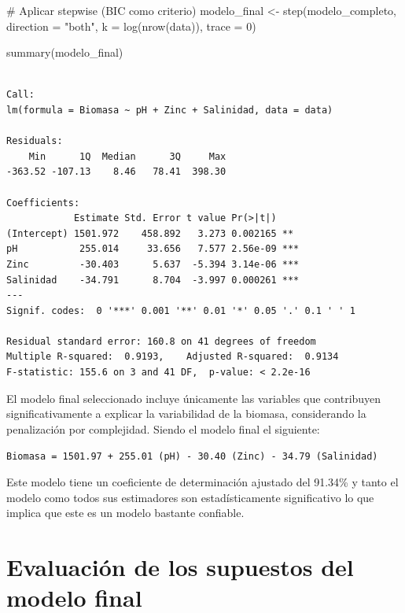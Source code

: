\documentclass[
  spanish,
  a4paper,
  DIV=11,
  numbers=noendperiod,
  onepage,
  openany]{scrreprt}
\newenvironment{Shaded}{\begin{snugshade}}{\end{snugshade}}
\newcommand{\AttributeTok}[1]{\textcolor[rgb]{0.40,0.45,0.13}{#1}}
\newcommand{\CommentTok}[1]{\textcolor[rgb]{0.37,0.37,0.37}{#1}}
\newcommand{\DecValTok}[1]{\textcolor[rgb]{0.68,0.00,0.00}{#1}}
\newcommand{\FunctionTok}[1]{\textcolor[rgb]{0.28,0.35,0.67}{#1}}
\newcommand{\NormalTok}[1]{\textcolor[rgb]{0.00,0.23,0.31}{#1}}
\newcommand{\OtherTok}[1]{\textcolor[rgb]{0.00,0.23,0.31}{#1}}
\newcommand{\StringTok}[1]{\textcolor[rgb]{0.13,0.47,0.30}{#1}}
\begin{document}
\begin{Shaded}
\begin{Highlighting}[]
\CommentTok{\# Aplicar stepwise (BIC como criterio)}
\NormalTok{modelo\_final }\OtherTok{\textless{}{-}} \FunctionTok{step}\NormalTok{(modelo\_completo, }\AttributeTok{direction =} \StringTok{"both"}\NormalTok{,}
                     \AttributeTok{k =} \FunctionTok{log}\NormalTok{(}\FunctionTok{nrow}\NormalTok{(data)), }\AttributeTok{trace =} \DecValTok{0}\NormalTok{)}

\FunctionTok{summary}\NormalTok{(modelo\_final)}
\end{Highlighting}
\end{Shaded}

\begin{verbatim}

Call:
lm(formula = Biomasa ~ pH + Zinc + Salinidad, data = data)

Residuals:
    Min      1Q  Median      3Q     Max 
-363.52 -107.13    8.46   78.41  398.30 

Coefficients:
            Estimate Std. Error t value Pr(>|t|)    
(Intercept) 1501.972    458.892   3.273 0.002165 ** 
pH           255.014     33.656   7.577 2.56e-09 ***
Zinc         -30.403      5.637  -5.394 3.14e-06 ***
Salinidad    -34.791      8.704  -3.997 0.000261 ***
---
Signif. codes:  0 '***' 0.001 '**' 0.01 '*' 0.05 '.' 0.1 ' ' 1

Residual standard error: 160.8 on 41 degrees of freedom
Multiple R-squared:  0.9193,    Adjusted R-squared:  0.9134 
F-statistic: 155.6 on 3 and 41 DF,  p-value: < 2.2e-16
\end{verbatim}

El modelo final seleccionado incluye únicamente las variables que
contribuyen significativamente a explicar la variabilidad de la biomasa,
considerando la penalización por complejidad. Siendo el modelo final el
siguiente:

\texttt{Biomasa\ =\ 1501.97\ +\ 255.01\ (pH)\ -\ 30.40\ (Zinc)\ -\ 34.79\ (Salinidad)}

Este modelo tiene un coeficiente de determinación ajustado del 91.34\% y
tanto el modelo como todos sus estimadores son estadísticamente
significativo lo que implica que este es un modelo bastante confiable.

\section{Evaluación de los supuestos del modelo
final}\label{evaluaciuxf3n-de-los-supuestos-del-modelo-final}
\end{document}

